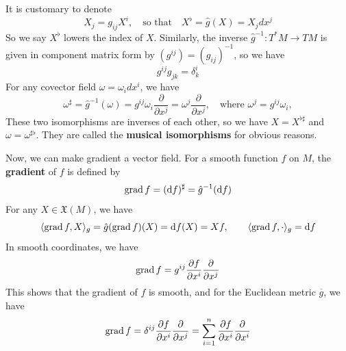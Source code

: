 \documentclass[../main.tex]{subfiles}
\begin{document}
It is customary to denote
\begin{equation}
  X_j = g_{ij} X^i, \quad \text{so that} \quad X^\flat = \hat{g}(X) = X_j dx^j
\end{equation}
So we say $X^\flat$ lowers the index of $X$. Similarly, the inverse $\hat{g}^{-1}: T^*M \to TM$ is given in component matrix form by $(g^{ij}) = (g_{ij})^{-1}$, so we have
\begin{equation*}
  g^{ij} g_{jk} = \delta^i_k
\end{equation*}
For any covector field $\omega = \omega_i dx^i$, we have
\begin{equation}
  \omega^\sharp = \hat{g}^{-1}(\omega) = g^{ij} \omega_i \frac{\partial}{\partial x^j} = \omega^j \frac{\partial}{\partial x^j}, \quad \text{where } \omega^j = g^{ij} \omega_i,
\end{equation}
These two isomorphisms are inverses of each other, so we have $X = X^{\flat \sharp}$ and $\omega = \omega^{\sharp \flat}$. They are called the \textbf{musical isomorphisms} for obvious reasons.

Now, we can make gradient a vector field. For a smooth function $f$ on $M$, the \textbf{gradient} of $f$ is defined by
\begin{equation}
  \operatorname{grad} f = (\mathrm{d} f)^\sharp = \hat{g}^{-1}(\mathrm{d} f)
\end{equation}
For any $X \in \mathfrak{X}(M)$, we have
\begin{equation*}
  \langle \operatorname{grad} f, X \rangle_g = \hat{g}(\operatorname{grad} f)(X) = \mathrm{d} f(X) = X f, \qquad \langle \operatorname{grad} f, \cdot \rangle_g = \mathrm{d} f
\end{equation*}
In smooth coordinates, we have
\begin{equation*}
  \operatorname{grad} f = g^{ij} \frac{\partial f}{\partial x^i} \frac{\partial}{\partial x^j}
\end{equation*}
This shows that the gradient of $f$ is smooth, and for the Euclidean metric $\overline{g}$, we have
\begin{equation*}
  \operatorname{grad} f = \delta^{ij} \frac{\partial f}{\partial x^i} \frac{\partial}{\partial x^j} = \sum_{i=1}^n \frac{\partial f}{\partial x^i} \frac{\partial}{\partial x^i}
\end{equation*}
\end{document}
